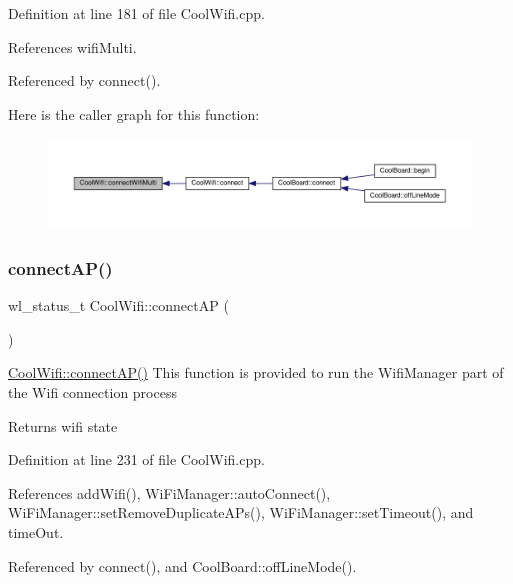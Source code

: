 Definition at line 181 of file Cool\+Wifi.\+cpp.



References wifi\+Multi.



Referenced by connect().

Here is the caller graph for this function\+:
\nopagebreak
\begin{figure}[H]
\begin{center}
\leavevmode
\includegraphics[width=350pt]{d7/d29/class_cool_wifi_a419de92d738f14b7444cf822b3ab0070_icgraph}
\end{center}
\end{figure}
\mbox{\label{class_cool_wifi_a7c857f27161782f5ef1d62d552aff971}} 
\subsubsection{\texorpdfstring{connect\+A\+P()}{connectAP()}}
{\footnotesize\ttfamily wl\+\_\+status\+\_\+t Cool\+Wifi\+::connect\+AP (\begin{DoxyParamCaption}{ }\end{DoxyParamCaption})}

\hyperlink{class_cool_wifi_a7c857f27161782f5ef1d62d552aff971}{Cool\+Wifi\+::connect\+A\+P()} This function is provided to run the Wifi\+Manager part of the Wifi connection process

\begin{DoxyReturn}{Returns}
wifi state 
\end{DoxyReturn}


Definition at line 231 of file Cool\+Wifi.\+cpp.



References add\+Wifi(), Wi\+Fi\+Manager\+::auto\+Connect(), Wi\+Fi\+Manager\+::set\+Remove\+Duplicate\+A\+Ps(), Wi\+Fi\+Manager\+::set\+Timeout(), and time\+Out.



Referenced by connect(), and Cool\+Board\+::off\+Line\+Mode().

